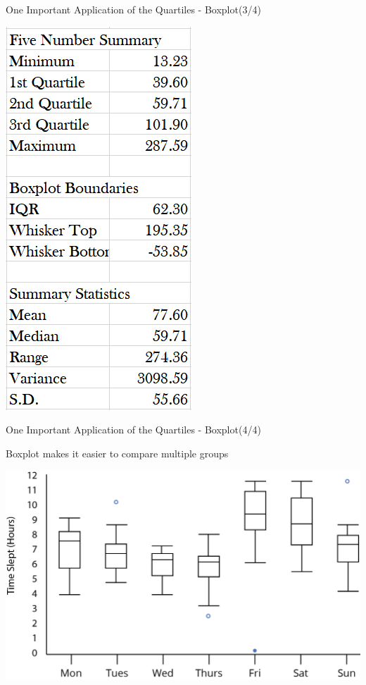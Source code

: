 \documentclass{beamer}
\begin{document}
\begin{frame}{One Important Application of the Quartiles - Boxplot(3/4)}
\begin{multicols}{2}
\begin{center}
\vspace{0.3 cm}
\includegraphics[scale=0.5]{images/ch2BoxPlotSingleNumerics.png}

\end{center}

\end{multicols}
\end{frame}


\begin{frame}{One Important Application of the Quartiles - Boxplot(4/4)}

\begin{center}
Boxplot makes it easier to compare multiple groups
\vspace{0.3cm}

\includegraphics[scale=0.17]{images/ch2BoxPlotGroup.jpg}

\end{center}

\end{frame}
\end{document}
